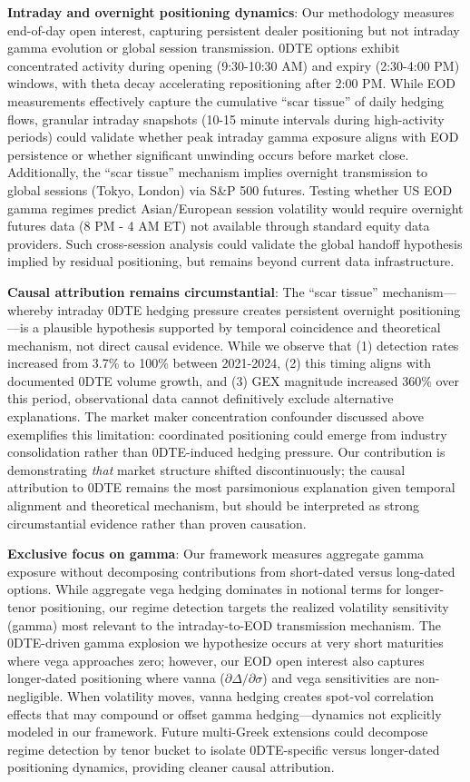 \textbf{Intraday and overnight positioning dynamics}: Our methodology measures end-of-day open interest, capturing persistent dealer positioning but not intraday gamma evolution or global session transmission. 0DTE options exhibit concentrated activity during opening (9:30-10:30 AM) and expiry (2:30-4:00 PM) windows, with theta decay accelerating repositioning after 2:00 PM. While EOD measurements effectively capture the cumulative ``scar tissue'' of daily hedging flows, granular intraday snapshots (10-15 minute intervals during high-activity periods) could validate whether peak intraday gamma exposure aligns with EOD persistence or whether significant unwinding occurs before market close. Additionally, the ``scar tissue'' mechanism implies overnight transmission to global sessions (Tokyo, London) via S\&P 500 futures. Testing whether US EOD gamma regimes predict Asian/European session volatility would require overnight futures data (8 PM - 4 AM ET) not available through standard equity data providers. Such cross-session analysis could validate the global handoff hypothesis implied by residual positioning, but remains beyond current data infrastructure.

\textbf{Causal attribution remains circumstantial}: The ``scar tissue'' mechanism—whereby intraday 0DTE hedging pressure creates persistent overnight positioning—is a plausible hypothesis supported by temporal coincidence and theoretical mechanism, not direct causal evidence. While we observe that (1) detection rates increased from 3.7\% to 100\% between 2021-2024, (2) this timing aligns with documented 0DTE volume growth, and (3) GEX magnitude increased 360\% over this period, observational data cannot definitively exclude alternative explanations. The market maker concentration confounder discussed above exemplifies this limitation: coordinated positioning could emerge from industry consolidation rather than 0DTE-induced hedging pressure. Our contribution is demonstrating \textit{that} market structure shifted discontinuously; the causal attribution to 0DTE remains the most parsimonious explanation given temporal alignment and theoretical mechanism, but should be interpreted as strong circumstantial evidence rather than proven causation.

\textbf{Exclusive focus on gamma}: Our framework measures aggregate gamma exposure without decomposing contributions from short-dated versus long-dated options. While aggregate vega hedging dominates in notional terms for longer-tenor positioning, our regime detection targets the realized volatility sensitivity (gamma) most relevant to the intraday-to-EOD transmission mechanism. The 0DTE-driven gamma explosion we hypothesize occurs at very short maturities where vega approaches zero; however, our EOD open interest also captures longer-dated positioning where vanna ($\partial\Delta/\partial\sigma$) and vega sensitivities are non-negligible. When volatility moves, vanna hedging creates spot-vol correlation effects that may compound or offset gamma hedging---dynamics not explicitly modeled in our framework. Future multi-Greek extensions could decompose regime detection by tenor bucket to isolate 0DTE-specific versus longer-dated positioning dynamics, providing cleaner causal attribution.

